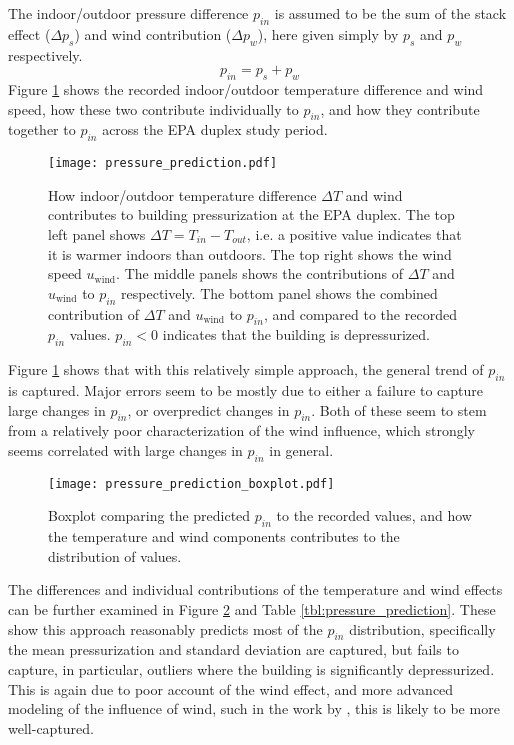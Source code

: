 The indoor/outdoor pressure difference $p_{in}$ is assumed to be the sum of the stack effect ($\Delta p_s $) and wind contribution ($\Delta p_w$), here given simply by $p_s$ and $p_w$ respectively.
\begin{equation}
  p_{in} = p_s + p_w
\end{equation}
Figure \ref{fig:pressure_prediction} shows the recorded indoor/outdoor temperature difference and wind speed, how these two contribute individually to $p_{in}$, and how they contribute together to $p_{in}$ across the EPA duplex study period.\par

\begin{figure}[htb!]
  \centering
  \texttt{[image: pressure\_prediction.pdf]}
  \caption{How indoor/outdoor temperature difference $\Delta T$ and wind contributes to building pressurization at the EPA duplex. The top left panel shows $\Delta T = T_{in} - T_{out}$, i.e. a positive value indicates that it is warmer indoors than outdoors. The top right shows the wind speed $u_\mathrm{wind}$. The middle panels shows the  contributions of $\Delta T$ and $u_\mathrm{wind}$ to $p_{in}$ respectively. The bottom panel shows the combined contribution of $\Delta T$ and $u_\mathrm{wind}$ to $p_{in}$, and compared to the recorded $p_{in}$ values. $p_{in} < 0$ indicates that the building is depressurized.}
  \label{fig:pressure_prediction}
\end{figure}

Figure \ref{fig:pressure_prediction} shows that with this relatively simple approach, the general trend of $p_{in}$ is captured.
Major errors seem to be mostly due to either a failure to capture large changes in $p_{in}$, or overpredict changes in $p_{in}$.
Both of these seem to stem from a relatively poor characterization of the wind influence, which strongly seems correlated with large changes in $p_{in}$ in general.\par

\begin{figure}[htb!]
  \centering
  \texttt{[image: pressure\_prediction\_boxplot.pdf]}
  \caption{Boxplot comparing the predicted $p_{in}$ to the recorded values, and how the temperature and wind components contributes to the distribution of values.}
  \label{fig:pressure_prediction_boxplot}
\end{figure}

The differences and individual contributions of the temperature and wind effects can be further examined in Figure \ref{fig:pressure_prediction_boxplot} and Table \ref{tbl:pressure_prediction}. These show this approach reasonably predicts most of the $p_{in}$ distribution, specifically the mean pressurization and standard deviation are captured, but fails to capture, in particular, outliers where the building is significantly depressurized.
This is again due to poor account of the wind effect, and more advanced modeling of the influence of wind, such in the work by \citeauthor{shirazi_three-dimensional_2017}\cite{shirazi_three-dimensional_2017}, this is likely to be more well-captured.\par


